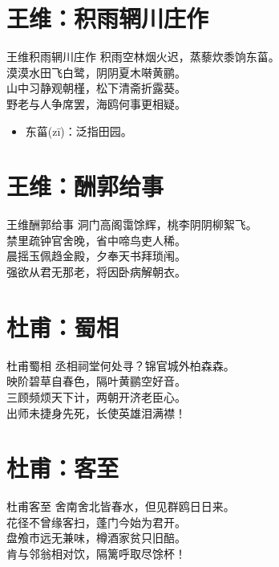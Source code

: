 \documentclass[12pt,oneside,a5paper]{book}
\begin{document}
\chapter{王维：积雨辋川庄作}
\begin{poemzh}{王维}{积雨辋川庄作}
积雨空林烟火迟，蒸藜炊黍饷东菑。\\
漠漠水田飞白鹭，阴阴夏木啭黄鹂。\\
山中习静观朝槿，松下清斋折露葵。\\
野老与人争席罢，海鸥何事更相疑。\\ 
\end{poemzh}

\begin{itemize}
\item 东菑(zī)：泛指田园。
\end{itemize}

\chapter{王维：酬郭给事}
\begin{poemzh}{王维}{酬郭给事}
洞门高阁霭馀辉，桃李阴阴柳絮飞。\\
禁里疏钟官舍晚，省中啼鸟吏人稀。\\
晨摇玉佩趋金殿，夕奉天书拜琐闱。\\
强欲从君无那老，将因卧病解朝衣。\\ 
\end{poemzh}

\chapter{杜甫：蜀相}
\begin{poemzh}{杜甫}{蜀相}
丞相祠堂何处寻？锦官城外柏森森。\\
映阶碧草自春色，隔叶黄鹂空好音。\\
三顾频烦天下计，两朝开济老臣心。\\
出师未捷身先死，长使英雄泪满襟！\\ 
\end{poemzh}

\chapter{杜甫：客至}
\begin{poemzh}{杜甫}{客至}
舍南舍北皆春水，但见群鸥日日来。\\
花径不曾缘客扫，蓬门今始为君开。\\
盘飧市远无兼味，樽酒家贫只旧醅。\\
肯与邻翁相对饮，隔篱呼取尽馀杯！\\ 
\end{poemzh}
\end{document}
